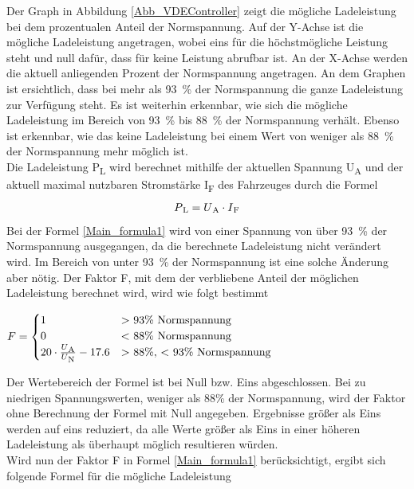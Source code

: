 Der Graph in Abbildung \ref{Abb_VDEController} zeigt die mögliche Ladeleistung bei dem prozentualen Anteil der Normspannung. Auf der Y-Achse ist die mögliche Ladeleistung angetragen, wobei eins für die höchstmögliche Leistung steht und null dafür, dass für keine Leistung abrufbar ist. An der X-Achse werden die aktuell anliegenden Prozent der Normspannung angetragen. An dem Graphen ist ersichtlich, dass bei mehr als 93~\% der Normspannung die ganze Ladeleistung zur Verfügung steht. Es ist weiterhin erkennbar, wie sich die mögliche Ladeleistung im Bereich von 93~\% bis 88~\% der Normspannung verhält. Ebenso ist erkennbar, wie das keine Ladeleistung bei einem Wert von weniger als 88~\% der Normspannung mehr möglich ist. \\
Die Ladeleistung P\textsubscript{L} wird berechnet mithilfe der aktuellen Spannung U\textsubscript{A} und der aktuell maximal nutzbaren Stromstärke I\textsubscript{F} des Fahrzeuges durch die Formel
\begin{align}
	P\textsubscript{L} = U\textsubscript{A} \cdot I\textsubscript{F} \label{Main_formula1}
\end{align}
Bei der Formel \ref{Main_formula1} wird von einer Spannung von über 93~\% der Normspannung ausgegangen, da die berechnete Ladeleistung nicht verändert wird. Im Bereich von unter 93~\% der Normspannung ist eine solche Änderung aber nötig. Der Faktor F, mit dem der verbliebene Anteil der möglichen Ladeleistung berechnet wird, wird wie folgt bestimmt \\
\begin{center}
	$ F = \begin{cases}
	1 &  \text{$>$ 93\% Normspannung} \\
	0 &  \text{$<$ 88\% Normspannung} \\
	20 \cdot \frac{U\textsubscript{A}}{U\textsubscript{N}} - 17.6 & \text{$>$ 88\%, $<$ 93\% Normspannung}
	\end{cases}
	$
\end{center}
Der Wertebereich der Formel ist bei Null bzw. Eins abgeschlossen. Bei zu niedrigen Spannungswerten, weniger als 88\% der Normspannung, wird der Faktor ohne Berechnung der Formel mit Null angegeben. Ergebnisse größer als Eins werden auf eins reduziert, da alle Werte größer als Eins in einer höheren Ladeleistung als überhaupt möglich resultieren würden. \\
Wird nun der Faktor F in Formel \ref{Main_formula1} berücksichtigt, ergibt sich folgende Formel für die mögliche Ladeleistung\\
